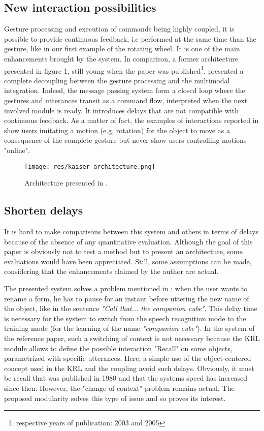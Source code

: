\documentclass[a4paper]{article}
\begin{document}
\subsection{New interaction possibilities}
\label{subsec:possibilities}

Gesture processing and execution of commands being highly coupled, it is possible to provide continuous feedback, i.e performed at the same time than the gesture, like in our first example of the rotating wheel. It is one of the main enhancements brought by the system. In comparison, a former architecture presented in figure \ref{fig:kaiser}, still young when the paper was published\footnote{respective years of publication: 2003 and 2005}, presented a complete decoupling between the gesture processing and the multimodal integration. Indeed, the message passing system form a closed loop where the gestures and utterances transit as a command flow, interpreted when the next involved module is ready. It introduces delays that are not compatible with continuous feedback. As a matter of fact, the examples of interactions reported in \cite{kaiser} show users imitating a motion (e.g, rotation) for the object to move as a consequence of the complete gesture but never show users controlling motions "online".

\begin{figure}[!h]
\centering
\texttt{[image: res/kaiser\_architecture.png]}
\caption{\label{fig:kaiser}Architecture presented in \cite{kaiser}.}
\end{figure}

\subsection{Shorten delays}
\label{subsec:delays}
It is hard to make comparisons between this system and others in terms of delays because of the absence of any quantitative evaluation. Although the goal of this paper is obviously not to test a method but to present an architecture, some evaluations would have been appreciated. Still, some assumptions can be made, considering that the enhancements claimed by the author are actual.

The presented system solves a problem mentioned in \cite{putthatthere}: when the user wants to rename a form, he has to pause for an instant before uttering the new name of the object, like in the sentence \textit{"Call that... the companion cube"}. This delay time is necessary for the system to switch from the speech recognition mode to the training mode (for the learning of the name \textit{"companion cube"}). In the system of the reference paper, such a switching of context is not necessary because the KRL module allows to define the possible interaction "Recall" on some objects, parametrized with specific utterances. Here, a simple use of the object-centered concept used in the KRL and the coupling avoid such delays. Obviously, it must be recall that \cite{putthatthere} was published in 1980 and that the systems speed has increased since then. However, the "change of context" problem remains actual. The proposed modularity solves this type of issue and so proves its interest.
\end{document}
